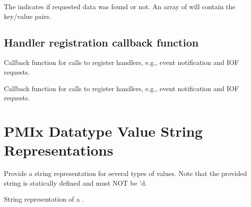 \descr

The  indicates if requested data was found or not.
An array of  will contain the key/value pairs.

\subsection{Handler registration callback function}

\summary

Callback function for calls to register handlers, e.g., event notification and IOF requests.

\format


\begin{arglist}
\end{arglist}

\descr

Callback function for calls to register handlers, e.g., event notification and IOF requests.


\section{PMIx Datatype Value String Representations}

Provide a string representation for several types of values.
Note that the provided string is statically defined and must NOT be 'd.

\summary
{}

String representation of a .

